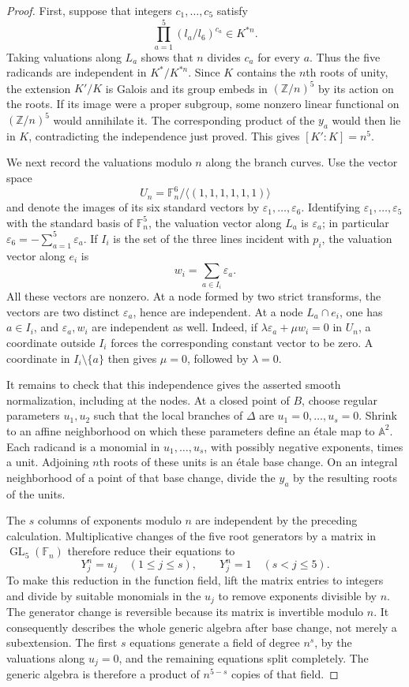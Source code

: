 \begin{proof}
First, suppose that integers $c_1,\ldots,c_5$ satisfy
\[
 \prod_{a=1}^5(l_a/l_6)^{c_a}\in K^{*n}.
\]
Taking valuations along $L_a$ shows that $n$ divides $c_a$ for every $a$.
Thus the five radicands are independent in $K^*/K^{*n}$.  Since $K$
contains the $n$th roots of unity, the extension $K'/K$ is Galois and its
group embeds in $(\mathbb Z/n)^5$ by its action on the roots.  If its
image were a proper subgroup, some nonzero linear functional on
$(\mathbb Z/n)^5$ would annihilate it.  The corresponding product of
the $y_a$ would then lie in $K$, contradicting the independence just
proved.  This gives $[K':K]=n^5$.

We next record the valuations modulo $n$ along the branch curves.  Use
the vector space
\[
 U_n=\mathbb F_n^6/\langle(1,1,1,1,1,1)\rangle
\]
and denote the images of its six standard vectors by
$\varepsilon_1,\ldots,\varepsilon_6$.  Identifying
$\varepsilon_1,\ldots,\varepsilon_5$ with the standard basis of
$\mathbb F_n^5$, the valuation vector along $L_a$ is
$\varepsilon_a$; in particular
$\varepsilon_6=-\sum_{a=1}^5\varepsilon_a$.  If $I_i$ is the set of
the three lines incident with $p_i$, the valuation vector along $e_i$ is
\[
 w_i=\sum_{a\in I_i}\varepsilon_a.
\]
All these vectors are nonzero.  At a node formed by two strict
transforms, the vectors are two distinct $\varepsilon_a$, hence are
independent.  At a node $L_a\cap e_i$, one has $a\in I_i$, and
$\varepsilon_a,w_i$ are independent as well.  Indeed, if
$\lambda\varepsilon_a+\mu w_i=0$ in $U_n$, a coordinate outside $I_i$
forces the corresponding constant vector to be zero.  A coordinate in
$I_i\setminus\{a\}$ then gives $\mu=0$, followed by $\lambda=0$.

It remains to check that this independence gives the asserted smooth
normalization, including at the nodes.  At a closed point of $B$, choose
regular parameters $u_1,u_2$ such that the local branches of $\Delta$
are $u_1=0,\ldots,u_s=0$.  Shrink to an affine neighborhood on which
these parameters define an \'{e}tale map to $\mathbb A^2$.  Each radicand
is a monomial in $u_1,\ldots,u_s$, with possibly negative exponents,
times a unit.  Adjoining $n$th roots of these units is an \'{e}tale base
change.  On an integral neighborhood of a point of that base change,
divide the $y_a$ by the resulting roots of the units.

The $s$ columns of exponents modulo $n$ are independent by the preceding
calculation.  Multiplicative changes of the five root generators by a
matrix in $\operatorname{GL}_5(\mathbb F_n)$ therefore reduce their
equations to
\[
 Y_j^n=u_j\quad(1\leq j\leq s),\qquad
 Y_j^n=1\quad(s<j\leq5).
\]
To make this reduction in the function field, lift the matrix entries
to integers and divide by suitable monomials in the $u_j$ to remove
exponents divisible by $n$.  The generator change is reversible because
its matrix is invertible modulo $n$.  It consequently describes the
whole generic algebra after base change, not merely a subextension.
The first $s$ equations generate a field of degree $n^s$, by the
valuations along $u_j=0$, and the remaining equations split completely.
The generic algebra is therefore a product of $n^{5-s}$ copies of that
field.


\end{proof}
